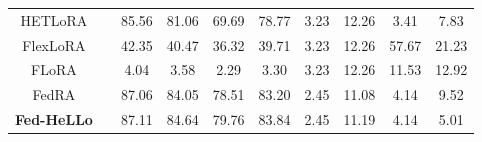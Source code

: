 \documentclass[lettersize,journal]{IEEEtran}
\begin{document}
\begin{table}[t]
{\begin{tabular}{c|c|cccc|cccc}
    HETLoRA &       & 85.56 & 81.06 & 69.69 & 78.77 & 3.23      & 12.26 & 3.41      &7.83  \\
    FlexLoRA &       & 42.35 & 40.47 & 36.32 & 39.71 & 3.23      & 12.26 & 57.67      &21.23  \\
    FLoRA &       & 4.04  & 3.58  & 2.29  & 3.30 & 3.23      & 12.26 & 11.53      & 12.92 \\
    FedRA &       & 87.06 & 84.05 & 78.51 & 83.20 & 2.45      & 11.08 &4.14       &9.52  \\
    \textbf{Fed-HeLLo} &       & \cellcolor[rgb]{ .749,  .749,  .749}87.11 & \cellcolor[rgb]{ .749,  .749,  .749}84.64 & \cellcolor[rgb]{ .749,  .749,  .749}79.76 & \cellcolor[rgb]{ .749,  .749,  .749}83.84 &2.45       & 11.19 &4.14       & 5.01 \\ \bottomrule[1pt]
    \end{tabular}%
    }
  \label{tab:main-cifar}%
\end{table}%
\end{document}
